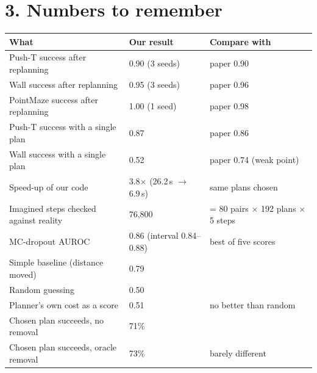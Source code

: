 \documentclass[11pt,a4paper]{article}
\begin{document}
\section*{3. Numbers to remember}
\begin{center}
\begin{tabular}{@{}lll@{}}
\toprule
What & Our result & Compare with \\
\midrule
Push-T success after replanning & 0.90 (3 seeds) & paper 0.90 \\
Wall success after replanning & 0.95 (3 seeds) & paper 0.96 \\
PointMaze success after replanning & 1.00 (1 seed) & paper 0.98 \\
Push-T success with a single plan & 0.87 & paper 0.86 \\
Wall success with a single plan & 0.52 & paper 0.74 (weak point) \\
Speed-up of our code & 3.8$\times$ (26.2\,s $\rightarrow$ 6.9\,s) & same plans chosen \\
Imagined steps checked against reality & 76,800 & = 80 pairs $\times$ 192 plans $\times$ 5 steps \\
MC-dropout AUROC & 0.86 (interval 0.84--0.88) & best of five scores \\
Simple baseline (distance moved) & 0.79 & \\
Random guessing & 0.50 & \\
Planner's own cost as a score & 0.51 & no better than random \\
Chosen plan succeeds, no removal & 71\% & \\
Chosen plan succeeds, oracle removal & 73\% & barely different \\
\bottomrule
\end{tabular}
\end{center}
\end{document}
